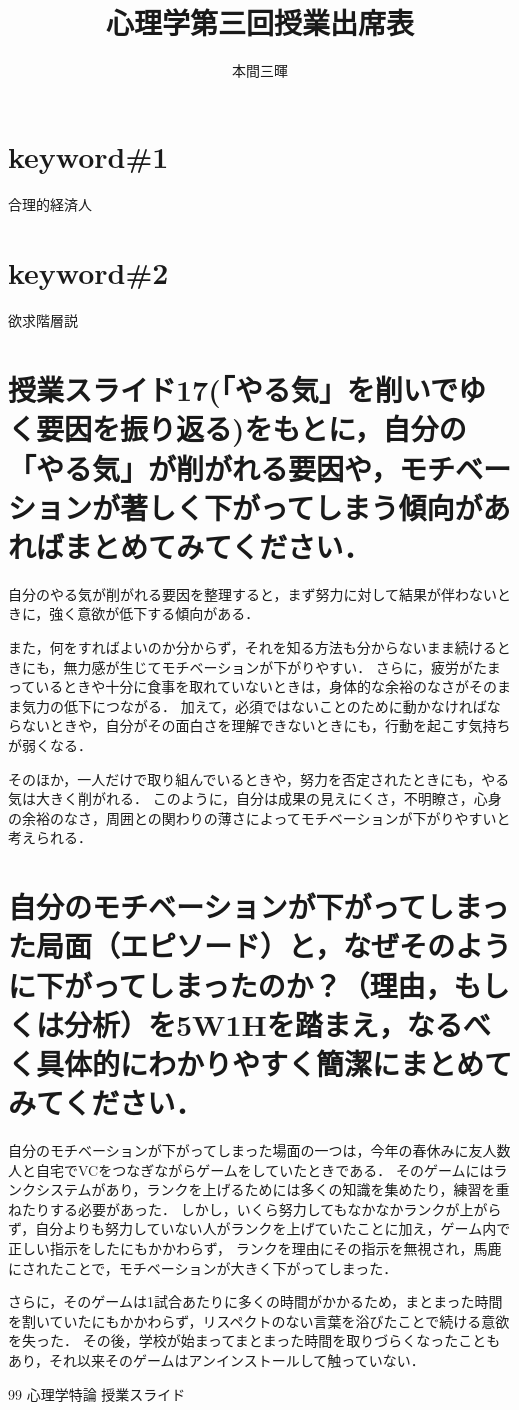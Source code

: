 \documentclass[titlepage,a4paper]{jsarticle}
\title{心理学第三回授業出席表}
\author{本間三暉}
\begin{document}
\maketitle
\section*{keyword\#1}
合理的経済人
\section*{keyword\#2}
欲求階層説
\section{授業スライド17(「やる気」を削いでゆく要因を振り返る)をもとに，自分の「やる気」が削がれる要因や，モチベーションが著しく下がってしまう傾向があればまとめてみてください．}
自分のやる気が削がれる要因を整理すると，まず努力に対して結果が伴わないときに，強く意欲が低下する傾向がある．

また，何をすればよいのか分からず，それを知る方法も分からないまま続けるときにも，無力感が生じてモチベーションが下がりやすい．
さらに，疲労がたまっているときや十分に食事を取れていないときは，身体的な余裕のなさがそのまま気力の低下につながる．
加えて，必須ではないことのために動かなければならないときや，自分がその面白さを理解できないときにも，行動を起こす気持ちが弱くなる．

そのほか，一人だけで取り組んでいるときや，努力を否定されたときにも，やる気は大きく削がれる．
このように，自分は成果の見えにくさ，不明瞭さ，心身の余裕のなさ，周囲との関わりの薄さによってモチベーションが下がりやすいと考えられる．

\section{自分のモチベーションが下がってしまった局面（エピソード）と，なぜそのように下がってしまったのか？（理由，もしくは分析）を5W1Hを踏まえ，なるべく具体的にわかりやすく簡潔にまとめてみてください．}
自分のモチベーションが下がってしまった場面の一つは，今年の春休みに友人数人と自宅でVCをつなぎながらゲームをしていたときである．
そのゲームにはランクシステムがあり，ランクを上げるためには多くの知識を集めたり，練習を重ねたりする必要があった．
しかし，いくら努力してもなかなかランクが上がらず，自分よりも努力していない人がランクを上げていたことに加え，ゲーム内で正しい指示をしたにもかかわらず，
ランクを理由にその指示を無視され，馬鹿にされたことで，モチベーションが大きく下がってしまった．

さらに，そのゲームは1試合あたりに多くの時間がかかるため，まとまった時間を割いていたにもかかわらず，リスペクトのない言葉を浴びたことで続ける意欲を失った．
その後，学校が始まってまとまった時間を取りづらくなったこともあり，それ以来そのゲームはアンインストールして触っていない．
\begin{thebibliography}{99}
\bibitem{} 心理学特論 授業スライド
\end{thebibliography}
\end{document}
